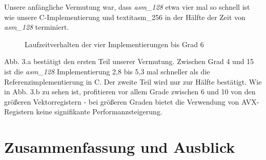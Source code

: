 \documentclass[course=erap]{aspdoc}
\begin{document}
Unsere anfängliche Vermutung war, dass \textit{asm\_128} etwa vier mal so schnell ist wie unsere C-Implementierung und textit{asm\_256} in der Hälfte der Zeit von \textit{asm\_128} terminiert.

\begin{figure}[htbp] 
    \centering
    \qquad
    \caption{Laufzeitverhalten der vier Implementierungen bis Grad 6}%
    \label{fig:Laufzeitvergleich}%
 \end{figure}
 
 Abb. 3.a bestätigt den ersten Teil unserer Vermutung. Zwischen Grad 4 und 15 ist die \textit{asm\_128} Implementierung 2,8 bis 5,3 mal schneller als die Referenzimplementierung in C. Der zweite Teil wird nur zur Hälfte bestätigt. Wie in Abb. 3.b zu sehen ist, profitieren vor allem Grade zwischen 6 und 10 von den größeren Vektorregistern - bei größeren Graden bietet die Verwendung von AVX-Registern keine signifikante Performanzsteigerung. 



\section{Zusammenfassung und Ausblick}


{}
\end{document}
